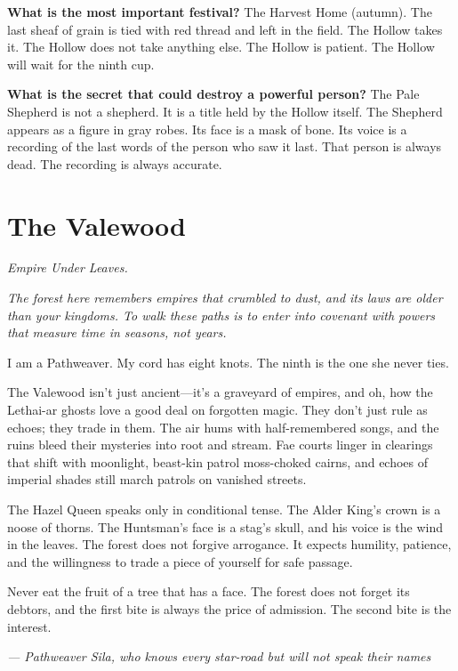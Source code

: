\begin{almanac}
\textbf{What is the most important festival?} The Harvest Home (autumn). The last sheaf of grain is tied with red thread and left in the field. The Hollow takes it. The Hollow does not take anything else. The Hollow is patient. The Hollow will wait for the ninth cup.

\textbf{What is the secret that could destroy a powerful person?} The Pale Shepherd is not a shepherd. It is a title held by the Hollow itself. The Shepherd appears as a figure in gray robes. Its face is a mask of bone. Its voice is a recording of the last words of the person who saw it last. That person is always dead. The recording is always accurate.
\end{almanac}

\newpage

\newpage

\chapter{The Valewood}
\emph{Empire Under Leaves.}

\noindent
{\Large
\textit{The forest here remembers empires that crumbled to dust, and its laws are older than your kingdoms. To walk these paths is to enter into covenant with powers that measure time in seasons, not years.}

\vspace{0.5em}

I am a Pathweaver. My cord has eight knots. The ninth is the one she never ties.

\vspace{0.5em}

The Valewood isn't just ancient---it's a graveyard of empires, and oh, how the Lethai-ar ghosts love a good deal on forgotten magic. They don't just rule as echoes; they trade in them. The air hums with half-remembered songs, and the ruins bleed their mysteries into root and stream. Fae courts linger in clearings that shift with moonlight, beast-kin patrol moss-choked cairns, and echoes of imperial shades still march patrols on vanished streets.

\vspace{0.5em}

The Hazel Queen speaks only in conditional tense. The Alder King's crown is a noose of thorns. The Huntsman's face is a stag's skull, and his voice is the wind in the leaves. The forest does not forgive arrogance. It expects humility, patience, and the willingness to trade a piece of yourself for safe passage.

\vspace{0.5em}

Never eat the fruit of a tree that has a face. The forest does not forget its debtors, and the first bite is always the price of admission. The second bite is the interest.

\vspace{1em}

\noindent\textit{--- Pathweaver Sila, who knows every star-road but will not speak their names}
}

